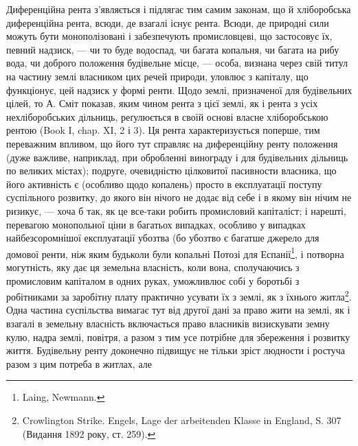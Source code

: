 Диференційна рента з’являється і підлягає тим самим законам, що й хліборобська
диференційна рента, всюди, де взагалі існує рента. Всюди, де природні
сили можуть бути монополізовані і забезпечують промисловцеві, що застосовує
їх, певний надзиск, — чи то буде водоспад, чи багата копальня, чи багата на
рибу вода, чи доброго положення будівельне місце, — особа, визнана через
свій титул на частину землі власником цих речей природи, уловлює з капіталу,
що функціонує, цей надзиск у формі ренти. Щодо землі, призначеної для будівельних
цілей, то А. Сміт показав, яким чином рента з цієї землі, як і рента
з усіх нехліборобських дільниць, реґулюється в своїй основі власне хліборобською
рентою (Book I, chap. XI, 2 і 3). Ця рента характеризується поперше, тим
переважним впливом, що його тут справляє на диференційну ренту положення
(дуже важливе, наприклад, при обробленні винограду і для будівельних дільниць
по великих містах); подруге, очевидністю цілковитої пасивности власника, що його
активність є (особливо щодо копалень) просто в експлуатації поступу суспільного
розвитку, до якого він нічого не додає від себе і в якому він нічим не
ризикує, — хоча б так, як це все-таки робить промисловий капіталіст; і нарешті,
перевагою монопольної ціни в багатьох випадках, особливо у випадках
найбезсоромнішої експлуатації убозтва (бо убозтво є багатше джерело для
домової ренти, ніж яким будьколи були копальні Потозі для Еспанії\footnote{
Laing, Newmann.
},
і потворна могутність, яку дає ця земельна власність, коли вона, сполучаючись
з промисловим капіталом в одних руках, уможливлює собі у боротьбі з робітниками
за заробітну плату практично усувати їх з землі, як з їхнього
житла\footnote{
Crowlington Strike. Engels, Lage der arbeitenden Klasse in England, S. 307 (Видання
1892 року, ст. 259).
}. Одна частина суспільства вимагає тут від другої дані за право
жити на землі, як і взагалі в земельну власність включається право власників
визискувати земну кулю, надра землі, повітря, а разом з тим усе
потрібне для збереження і розвитку життя. Будівельну ренту доконечно підвищує
не тільки зріст людности і ростуча разом з цим потреба в житлах, але